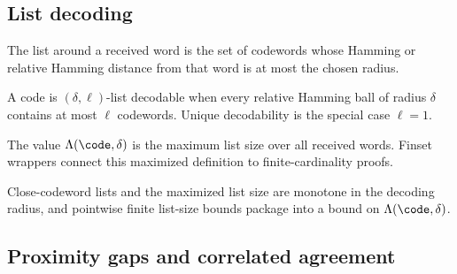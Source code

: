 \subsection{List decoding}\label{sec:list_decoding}

\begin{definition}\label{def:list_close_codewords}
    The list around a received word is the set of codewords whose Hamming or relative Hamming
    distance from that word is at most the chosen radius.
\end{definition}

\begin{definition}\label{def:list_decodable}
    A code is $(\delta,\ell)$-list decodable when every relative Hamming ball of radius
    $\delta$ contains at most $\ell$ codewords. Unique decodability is the special case
    $\ell = 1$.
\end{definition}

\begin{definition}\label{def:lambda_list_size}
    The value $\Lambda(\code,\delta)$ is the maximum list size over all received words. Finset
    wrappers connect this maximized definition to finite-cardinality proofs.
\end{definition}

\begin{lemma}\label{lem:list_size_basics}
    Close-codeword lists and the maximized list size are monotone in the decoding radius, and
    pointwise finite list-size bounds package into a bound on $\Lambda(\code,\delta)$.
\end{lemma}

\subsection{Proximity gaps and correlated agreement}\label{sec:proximity_gap_defs}

